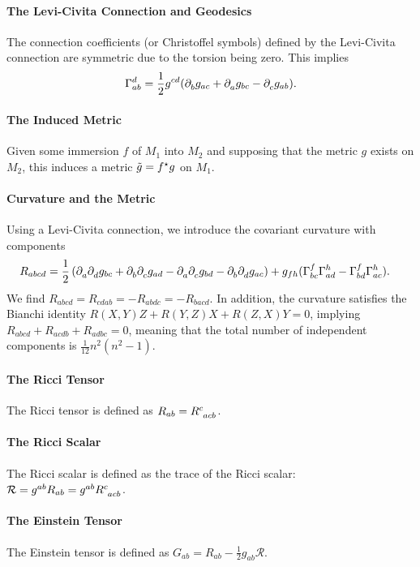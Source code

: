 \paragraph{The Levi-Civita Connection and Geodesics}
The connection coefficients (or Christoffel symbols) defined by the Levi-Civita connection are symmetric due to the torsion being zero. This implies
\begin{align*}
\chris{d}{a}{b} = \frac{1}{2}g^{cd}(\del{b}{g_{ac}} + \del{a}{g_{bc}} - \del{c}{g_{ab}}).
\end{align*}

\paragraph{The Induced Metric}
Given some immersion $f$ of $M_{1}$ into $M_{2}$ and supposing that the metric $g$ exists on $M_{2}$, this induces a metric $\tilde{g} = f^{\star}g$ on $M_{1}$.

\paragraph{Curvature and the Metric}
Using a Levi-Civita connection, we introduce the covariant curvature with components
\begin{align*}
R_{abcd} &= \frac{1}{2}\left(\del{a}{\del{d}{g_{bc}}} + \del{b}{\del{c}{g_{ad}}} - \del{a}{\del{c}{g_{bd}}} - \del{b}{\del{d}{g_{ac}}}\right) + g_{fh}(\chris{f}{b}{c}\chris{h}{a}{d} - \chris{f}{b}{d}\chris{h}{a}{c}).
\end{align*}
We find $R_{abcd} = R_{cdab} = -R_{abdc} = -R_{bacd}$. In addition, the curvature satisfies the Bianchi identity $R(X, Y)Z + R(Y, Z)X + R(Z, X)Y = 0$, implying $R_{abcd} + R_{acdb} + R_{adbc} = 0$, meaning that the total number of independent components is $\frac{1}{12}n^{2}(n^{2} - 1)$.

\paragraph{The Ricci Tensor}
The Ricci tensor is defined as $R_{ab} = \tensor{R}{^{c}_{acb}}$.

\paragraph{The Ricci Scalar}
The Ricci scalar is defined as the trace of the Ricci scalar: $\mathcal{R} = g^{ab}R_{ab} = g^{ab}\tensor{R}{^{c}_{acb}}$.

\paragraph{The Einstein Tensor}
The Einstein tensor is defined as $G_{ab} = R_{ab} - \frac{1}{2}g_{ab}\mathcal{R}$.

